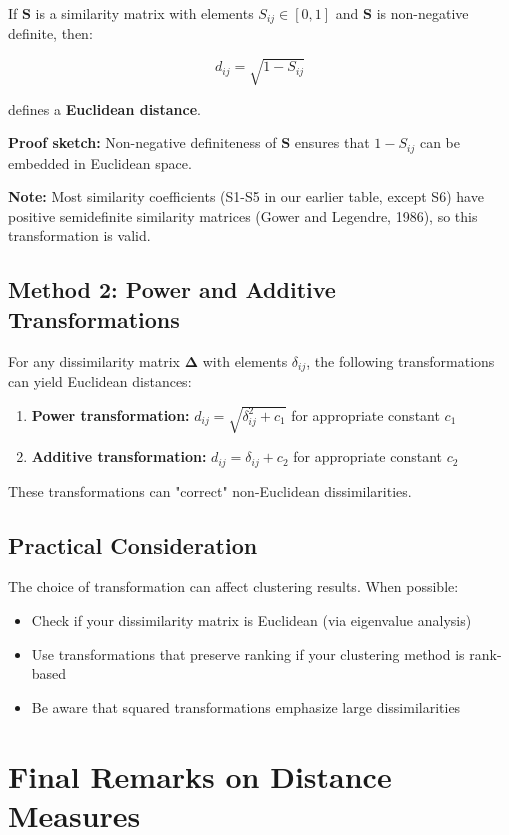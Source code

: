 \documentclass[11pt]{article}
\begin{document}
If $\mathbf{S}$ is a similarity matrix with elements $S_{ij} \in [0,1]$ and $\mathbf{S}$ is non-negative definite, then:

$$d_{ij} = \sqrt{1 - S_{ij}}$$

defines a \textbf{Euclidean distance}.

\textbf{Proof sketch:} Non-negative definiteness of $\mathbf{S}$ ensures that $1 - S_{ij}$ can be embedded in Euclidean space.

\textbf{Note:} Most similarity coefficients (S1-S5 in our earlier table, except S6) have positive semidefinite similarity matrices (Gower and Legendre, 1986), so this transformation is valid.

\subsection{Method 2: Power and Additive Transformations}

For any dissimilarity matrix $\boldsymbol{\Delta}$ with elements $\delta_{ij}$, the following transformations can yield Euclidean distances:

\begin{enumerate}
    \item \textbf{Power transformation:} $d_{ij} = \sqrt{\delta_{ij}^2 + c_1}$ for appropriate constant $c_1$
    \item \textbf{Additive transformation:} $d_{ij} = \delta_{ij} + c_2$ for appropriate constant $c_2$
\end{enumerate}

These transformations can "correct" non-Euclidean dissimilarities.

\subsection{Practical Consideration}

The choice of transformation can affect clustering results. When possible:
\begin{itemize}
    \item Check if your dissimilarity matrix is Euclidean (via eigenvalue analysis)
    \item Use transformations that preserve ranking if your clustering method is rank-based
    \item Be aware that squared transformations emphasize large dissimilarities
\end{itemize}

\section{Final Remarks on Distance Measures}
\end{document}
